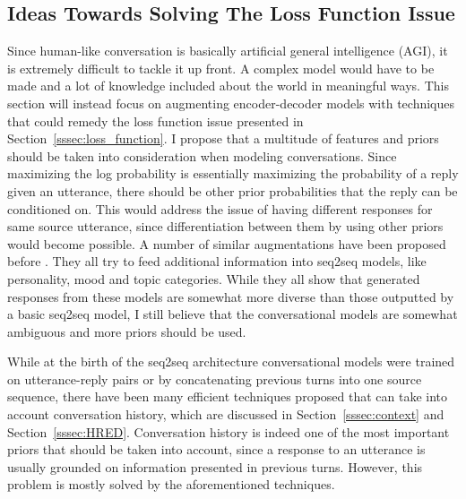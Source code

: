 \documentclass[12pt]{article}
\begin{document}
\subsection{Ideas Towards Solving The Loss Function Issue} \label{ssec:61}
Since human-like conversation is basically artificial general intelligence (AGI), it is extremely difficult to tackle it up front. A complex model would have to be made and a lot of knowledge included about the world in meaningful ways. This section will instead focus on augmenting encoder-decoder models with techniques that could remedy the loss function issue presented in Section~\ref{sssec:loss_function}. I propose that a multitude of features and priors should be taken into consideration when modeling conversations. Since maximizing the log probability is essentially maximizing the probability of a reply given an utterance, there should be other prior probabilities that the reply can be conditioned on. This would address the issue of having different responses for same source utterance, since differentiation between them by using other priors would become possible. A number of similar augmentations have been proposed before \cite{Li:2016,Xing_topic:2017,Zhou:2017,Choudhary:2017}. They all try to feed additional information into seq2seq models, like personality, mood and topic categories. While they all show that generated responses from these models are somewhat more diverse than those outputted by a basic seq2seq model, I still believe that the conversational models are somewhat ambiguous and more priors should be used.

While at the birth of the seq2seq architecture conversational models were trained on utterance-reply pairs or by concatenating previous turns into one source sequence, there have been many efficient techniques proposed that can take into account conversation history, which are discussed in Section~\ref{sssec:context} and Section~\ref{sssec:HRED}. Conversation history is indeed one of the most important priors that should be taken into account, since a response to an utterance is usually grounded on information presented in previous turns. However, this problem is mostly solved by the aforementioned techniques.
\end{document}
